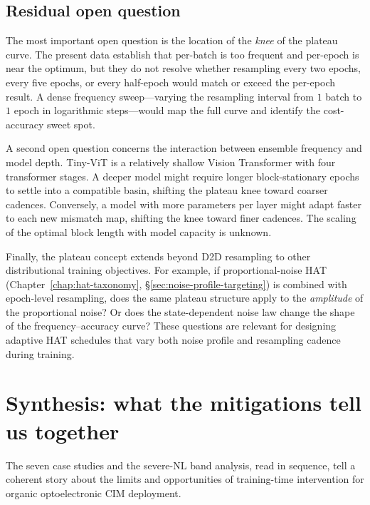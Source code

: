 \subsection{Residual open question}

The most important open question is the location of the \emph{knee} of the plateau curve. The present data establish that per-batch is too frequent and per-epoch is near the optimum, but they do not resolve whether resampling every two epochs, every five epochs, or every half-epoch would match or exceed the per-epoch result. A dense frequency sweep---varying the resampling interval from $1$ batch to $1$ epoch in logarithmic steps---would map the full curve and identify the cost-accuracy sweet spot.

A second open question concerns the interaction between ensemble frequency and model depth. Tiny-ViT is a relatively shallow Vision Transformer with four transformer stages. A deeper model might require longer block-stationary epochs to settle into a compatible basin, shifting the plateau knee toward coarser cadences. Conversely, a model with more parameters per layer might adapt faster to each new mismatch map, shifting the knee toward finer cadences. The scaling of the optimal block length with model capacity is unknown.

Finally, the plateau concept extends beyond D2D resampling to other distributional training objectives. For example, if proportional-noise HAT (Chapter~\ref{chap:hat-taxonomy}, \S\ref{sec:noise-profile-targeting}) is combined with epoch-level resampling, does the same plateau structure apply to the \emph{amplitude} of the proportional noise? Or does the state-dependent noise law change the shape of the frequency--accuracy curve? These questions are relevant for designing adaptive HAT schedules that vary both noise profile and resampling cadence during training.


\section{Synthesis: what the mitigations tell us together}
\label{sec:mitigation-synthesis}

The seven case studies and the severe-NL band analysis, read in sequence, tell a coherent story about the limits and opportunities of training-time intervention for organic optoelectronic CIM deployment.

